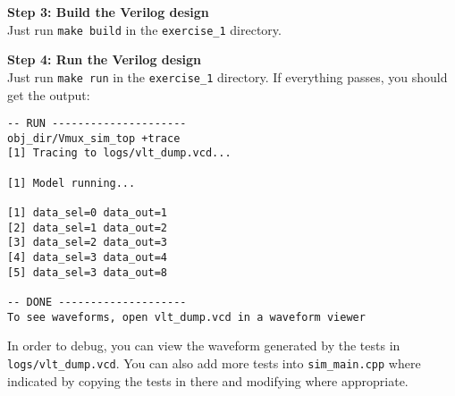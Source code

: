 \documentclass{article}
\begin{document}
\noindent\textbf{Step 3: Build the Verilog design}\\
Just run \texttt{make build} in the \texttt{exercise\_1} directory.

\noindent\textbf{Step 4: Run the Verilog design}\\
Just run \texttt{make run} in the \texttt{exercise\_1} directory. If everything
passes, you should get the output:

\begin{verbatim}
-- RUN ---------------------
obj_dir/Vmux_sim_top +trace
[1] Tracing to logs/vlt_dump.vcd...

[1] Model running...

[1] data_sel=0 data_out=1
[2] data_sel=1 data_out=2
[3] data_sel=2 data_out=3
[4] data_sel=3 data_out=4
[5] data_sel=3 data_out=8

-- DONE --------------------
To see waveforms, open vlt_dump.vcd in a waveform viewer
\end{verbatim}

In order to debug, you can view the waveform generated by the tests in
\texttt{logs/vlt\_dump.vcd}. You can also add more tests into
\texttt{sim\_main.cpp} where indicated by copying the tests in there and
modifying where appropriate.
\end{document}
